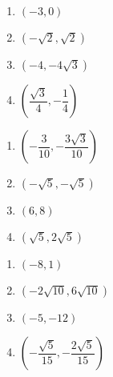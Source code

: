 \begin{multicols}{4} 

\begin{enumerate}

\setcounter{enumi}{\value{HW}}

\item $(-3, 0)$ 
\item $\left( -\sqrt{2}, \sqrt{2} \right)$ 
\item $\left( -4,-4\sqrt{3} \right)$ 
\item $\left( \dfrac{\sqrt{3}}{4}, -\dfrac{1}{4} \right)$

\setcounter{HW}{\value{enumi}}

\end{enumerate}

\end{multicols}

\begin{multicols}{4} 

\begin{enumerate}

\setcounter{enumi}{\value{HW}}

\item $\left( -\dfrac{3}{10}, -\dfrac{3\sqrt{3}}{10} \right)$
\item $\left( -\sqrt{5}, -\sqrt{5} \right)$ 
\item $(6,8)$ 
\item $(\sqrt{5},2\sqrt{5})$ 

\setcounter{HW}{\value{enumi}}

\end{enumerate}

\end{multicols}

\begin{multicols}{4} 

\begin{enumerate}

\setcounter{enumi}{\value{HW}}

\item $(-8,1)$ 
\item $(-2\sqrt{10}, 6\sqrt{10})$ 
\item $\left(-5, -12 \right)$ 
\item $\left(-\dfrac{\sqrt{5}}{15}, -\dfrac{2\sqrt{5}}{15}  \right)$

\setcounter{HW}{\value{enumi}}

\end{enumerate}

\end{multicols}

